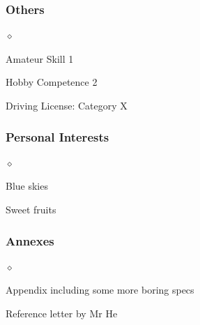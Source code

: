 \documentclass[a4paper]{article}
\renewenvironment{itemize}{
  \begin{list}{$\diamond$}{
    \setlength{\topsep}{0.25em}
    \setlength{\itemsep}{0em}
    \setlength{\parskip}{0pt}
    \setlength{\parsep}{0em}
  }
}{
  \end{list}
}
\begin{document}
      \subsubsection*{Others}
      \begin{itemize}
          \item Amateur Skill 1
          \item Hobby Competence 2
          \item Driving License: Category X
      \end{itemize}

      \subsubsection*{Personal Interests}
      \begin{itemize}
          \item Blue skies
          \item Sweet fruits
      \end{itemize}


      \subsubsection*{Annexes}
      \begin{itemize}
          \item Appendix including some more boring specs
          \item Reference letter by Mr He
      \end{itemize}
      \vfill
\end{document}
